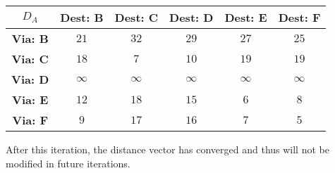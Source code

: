 \documentclass[]{article}
\begin{document}
	\begin{center}
		\begin{tabular}{ |c|c|c|c|c|c| } 
			\hline
			\textbf{$D_A$} & \textbf{Dest: B} & \textbf{Dest: C} &  \textbf{Dest: D} & \textbf{Dest: E} & \textbf{Dest: F} \\
			\hline
			\textbf{Via: B} & $21$ & $32$ & $29$ & $27$ & $25$ \\
			\hline 
			\textbf{Via: C} & $18$ & $7$ & $10$ & $19$ & $19$ \\
			\hline
			\textbf{Via: D} & $\infty$ & $\infty$ & $\infty$ & $\infty$ & $\infty$ \\
			\hline
			\textbf{Via: E} & $12$ & $18$ & $15$ & $6$ & $8$ \\
			\hline
			\textbf{Via: F} & $9$ & $17$ & $16$ & $7$ & $5$ \\
			\hline
		\end{tabular}
	\end{center}
	
	After this iteration, the distance vector has converged and thus will not be modified in future iterations.
\end{document}
